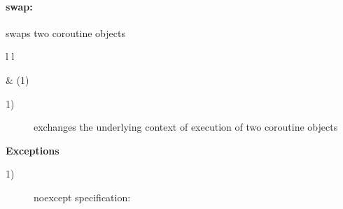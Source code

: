 \paragraph*{swap:}
swaps two coroutine objects\\

\begin{tabular}{ l l }
    \midrule

     & (1)\\

    \midrule
\end{tabular}

\begin{description}
    \item[1)] exchanges the underlying context of execution of two coroutine objects
\end{description}

{\bf Exceptions}
\begin{description}
    \item[1)] noexcept specification: 
\end{description}
